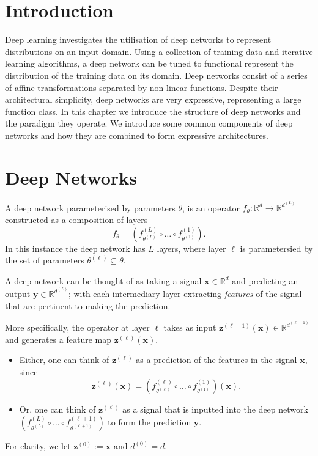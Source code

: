 \section{Introduction}

Deep learning investigates the utilisation of deep networks to represent distributions on an input domain. Using a collection of training data and iterative learning algorithms, a deep network can be tuned to functional represent the distribution of the training data on its domain. Deep networks consist of a series of affine transformations separated by non-linear functions. Despite their architectural simplicity, deep networks are very expressive, representing a large function class. In this chapter we introduce the structure of deep networks and the paradigm they operate. We introduce some common components of deep networks and how they are combined to form expressive architectures.

\section{Deep Networks}\label{sec:deep_networks}

A deep network parameterised by parameters $\theta$, is an operator $f_{\theta}:\mathbb{R}^d\to\mathbb{R}^{d^{(L)}}$ constructed as a composition of layers $$f_{\theta}=\left(f^{(L)}_{\theta^{(L)}}\circ\dots\circ f^{(1)}_{\theta^{(1)}}\right).$$In this instance the deep network has $L$ layers, where layer $\ell$ is parametersied by the set of parameters $\theta^{(\ell)}\subseteq\theta$.

A deep network can be thought of as taking a signal $\mathbf{x}\in\mathbb{R}^d$ and predicting an output $\mathbf{y}\in\mathbb{R}^{d^{(L)}}$; with each intermediary layer extracting \emph{features} of the signal that are pertinent to making the prediction.

More specifically, the operator at layer $\ell$ takes as input $\mathbf{z}^{(\ell-1)}(\mathbf{x})\in\mathbb{R}^{d^{(\ell-1)}}$ and generates a feature map $\mathbf{z}^{(\ell)}(\mathbf{x})$. 
\begin{itemize}
    \item Either, one can think of $\mathbf{z}^{(\ell)}$ as a prediction of the features in the signal $\mathbf{x}$, since $$\mathbf{z}^{(\ell)}(\mathbf{x})=\left(f^{(\ell)}_{{\theta}^{(\ell)}}\circ\dots\circ f^{(1)}_{\theta^{{(1)}}}\right)(\mathbf{x}).$$
    \item Or, one can think of $\mathbf{z}^{(\ell)}$ as a signal that is inputted into the deep network $\left(f^{(L)}_{{\theta}^{(L)}}\circ\dots\circ f^{(\ell+1)}_{\theta^{{(\ell+1)}}}\right)$ to form the prediction $\mathbf{y}$.
\end{itemize}
For clarity, we let $\mathbf{z}^{(0)}:=\mathbf{x}$ and $d^{(0)}=d$.

